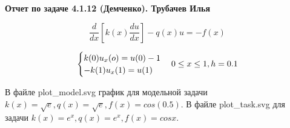 \documentclass[a4paper, 12pt]{article}
\begin{document}
	\begin{center}
		\textbf{Отчет по задаче 4.1.12 (Демченко). Трубачев Илья}
	\end{center}

	\begin{equation*}
		\frac{d}{dx} [k(x) \frac{du}{dx}] - q(x)u = -f(x)
	\end{equation*}
	
	\begin{equation*}
	\begin{cases}
	k(0) u_x(o) = u(0) - 1 \\
	-k(1) u_x(1) = u(1)
	\end{cases} \\
	0 \leq x \leq 1, h = 0.1
	\end{equation*}
	
	
	В файле plot\_model.svg график для модельной задачи $k(x) = \sqrt{e}, q(x) = \sqrt{e}, f(x) = cos(0.5)$. В файле plot\_task.svg для задачи $k(x) = e^x, q(x) = e^x, f(x) = cosx$.
\end{document}
